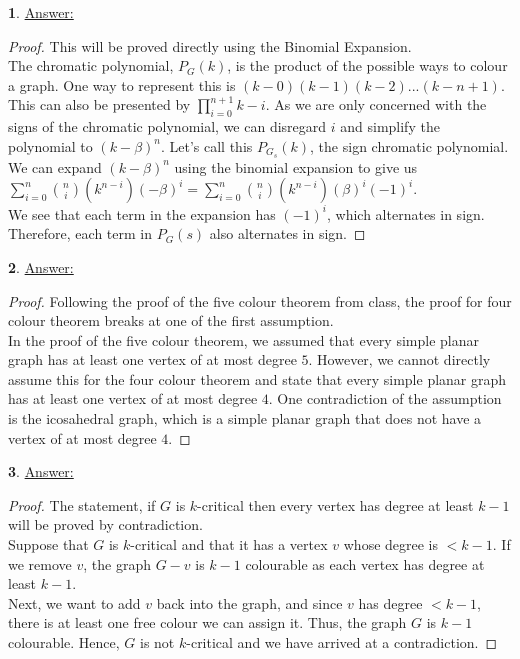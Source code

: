 \documentclass[12pt,a4paper]{article}
\theoremstyle{definition}
\newtheorem{problem}{}
\begin{document}
\begin{problem} \underline{Answer:} 
\begin{proof} This will be proved directly using the Binomial Expansion. \\

The chromatic polynomial, $P_G(k)$, is the product of the possible ways to colour a graph. One way to represent this is $(k - 0)(k - 1)(k - 2) ... (k - n + 1)$. This can also be presented by $\prod_{i = 0}^{n + 1} k - i$. 
As we are only concerned with the signs of the chromatic polynomial, we can disregard $i$ and simplify the polynomial to $(k - \beta)^n$. Let's call this $P_{G_s}(k)$, the sign chromatic polynomial. \\

We can expand $(k - \beta)^n$ using the binomial expansion to give us $\sum_{i = 0}^{n} {{n \choose i} (k^{n - i})(-\beta)^i} = \sum_{i = 0}^{n} {{n \choose i} (k^{n - i})(\beta)^i(-1)^i}$. \\

We see that each term in the expansion has $(-1)^i$, which alternates in sign. Therefore, each term in $P_G(s)$ also alternates in sign.
\end{proof}
\end{problem}

\begin{problem} \underline{Answer:} 
\begin{proof} Following the proof of the five colour theorem from class, the proof for four colour theorem breaks at one of the first assumption. \\

In the proof of the five colour theorem, we assumed that every simple planar graph has at least one vertex of at most degree $5$. However, we cannot directly assume this for the four colour theorem and state that every simple planar graph has at least one vertex of at most degree $4$.
One contradiction of the assumption is the icosahedral graph, which is a simple planar graph that does not have a vertex of at most degree $4$.
\end{proof}
\end{problem}

\begin{problem} \underline{Answer:}
\begin{proof} The statement, if $G$ is $k$-critical then every vertex has degree at least $k - 1$ will be proved by contradiction. \\

Suppose that $G$ is $k$-critical and that it has a vertex $v$ whose degree is $< k - 1$. If we remove $v$, the graph $G - v$ is $k - 1$ colourable as each vertex has degree at least $k - 1$. \\

Next, we want to add $v$ back into the graph, and since $v$ has degree $< k - 1$, there is at least one free colour we can assign it. Thus, the graph $G$ is $k - 1$ colourable. Hence, $G$ is not $k$-critical and we have arrived at a contradiction.
\end{proof}
\end{problem}
\end{document}
